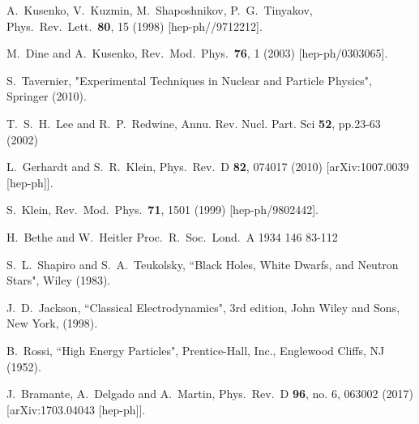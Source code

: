   A.~Kusenko, V.~Kuzmin, M.~Shaposhnikov, P.~G.~Tinyakov,
  Phys.\ Rev.\ Lett.\ {\bf 80}, 15 (1998)
  [hep-ph//9712212].

  M.~Dine and A.~Kusenko,
  Rev.\ Mod.\ Phys.\  {\bf 76}, 1 (2003)
  [hep-ph/0303065].


S.~Tavernier, "Experimental Techniques in Nuclear and Particle Physics", Springer (2010).

T.~S.~H.~Lee and R.~P.~Redwine,
 Annu. Rev. Nucl. Part. Sci {\bf 52}, pp.23-63 (2002)

  L.~Gerhardt and S.~R.~Klein,
  Phys.\ Rev.\ D {\bf 82}, 074017 (2010)
  [arXiv:1007.0039 [hep-ph]].


  S.~Klein,
  Rev.\ Mod.\ Phys.\  {\bf 71}, 1501 (1999)
  [hep-ph/9802442].


  H.~Bethe and W.~Heitler
  Proc.\ R.\ Soc.\ Lond.\ A 1934 146 83-112

S.~L.~Shapiro and S.~A.~Teukolsky, ``Black Holes, White Dwarfs, and Neutron Stars", Wiley (1983).

J.~D.~Jackson, ``Classical Electrodynamics", 3rd edition, John Wiley and Sons, New
York, (1998).

B.~Rossi, ``High Energy Particles", Prentice-Hall, Inc., Englewood Cliffs, NJ (1952).

  J.~Bramante, A.~Delgado and A.~Martin,
  Phys.\ Rev.\ D {\bf 96}, no. 6, 063002 (2017)
  [arXiv:1703.04043 [hep-ph]].


